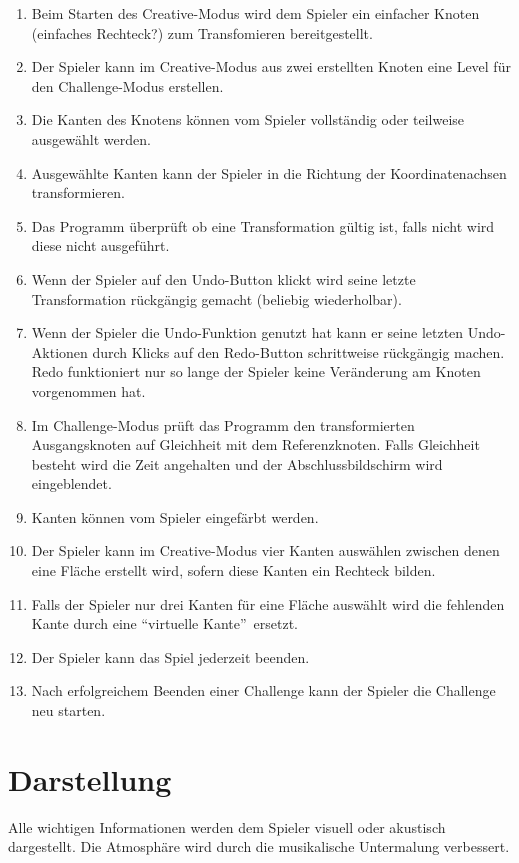 \begin{enumerate}[resume]

\item Beim Starten des Creative-Modus wird dem Spieler ein einfacher Knoten (einfaches Rechteck?) zum Transfomieren bereitgestellt.
\item Der Spieler kann im Creative-Modus aus zwei erstellten Knoten eine Level für den Challenge-Modus erstellen.
\item Die Kanten des Knotens können vom Spieler vollständig oder teilweise ausgewählt werden.
\item Ausgewählte Kanten kann der Spieler in die Richtung der Koordinatenachsen transformieren.
\item Das Programm überprüft ob eine Transformation gültig ist, falls nicht wird diese nicht ausgeführt.
\item Wenn der Spieler auf den Undo-Button klickt wird seine letzte Transformation rückgängig gemacht (beliebig wiederholbar). 
\item Wenn der Spieler die Undo-Funktion genutzt hat kann er seine letzten Undo-Aktionen durch Klicks auf den Redo-Button schrittweise rückgängig machen. Redo funktioniert nur so lange der Spieler keine Veränderung am Knoten vorgenommen hat. %
\item Im Challenge-Modus prüft das Programm den transformierten Ausgangsknoten auf Gleichheit mit dem Referenzknoten. Falls Gleichheit besteht wird die Zeit angehalten und der Abschlussbildschirm wird eingeblendet.
\item Kanten können vom Spieler eingefärbt werden. %
\item Der Spieler kann im Creative-Modus vier Kanten auswählen zwischen denen eine Fläche erstellt wird, sofern diese Kanten ein Rechteck bilden. %
\item Falls der Spieler nur drei Kanten für eine Fläche auswählt wird  die fehlenden Kante durch eine \textquotedblleft virtuelle Kante\textquotedblright~ersetzt.
\item Der Spieler kann das Spiel jederzeit beenden.
\item Nach erfolgreichem Beenden einer Challenge kann der Spieler die Challenge neu starten. %

\end{enumerate}

\section{Darstellung}
Alle wichtigen Informationen werden dem Spieler visuell oder akustisch dargestellt. Die Atmosphäre wird durch die musikalische Untermalung verbessert.

